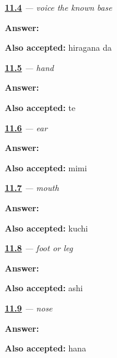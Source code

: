 \noindent\begin{minipage}[t]{\linewidth}
\raggedright
\hyperlink{review-JA-W11-da-write}{\textbf{11.4}} \emph{ — voice the known base}\par
\small \textbf{Answer:} \par
\footnotesize \textbf{Also accepted:} hiragana da
\end{minipage}\par\medskip

\noindent\begin{minipage}[t]{\linewidth}
\raggedright
\hyperlink{review-JA-C11-te-hand-meaning}{\textbf{11.5}} \emph{ — hand}\par
\small \textbf{Answer:} \par
\footnotesize \textbf{Also accepted:} te
\end{minipage}\par\medskip

\noindent\begin{minipage}[t]{\linewidth}
\raggedright
\hyperlink{review-JA-C11-mimi-meaning}{\textbf{11.6}} \emph{ — ear}\par
\small \textbf{Answer:} \par
\footnotesize \textbf{Also accepted:} mimi
\end{minipage}\par\medskip

\noindent\begin{minipage}[t]{\linewidth}
\raggedright
\hyperlink{review-JA-C11-kuchi-meaning}{\textbf{11.7}} \emph{ — mouth}\par
\small \textbf{Answer:} \par
\footnotesize \textbf{Also accepted:} kuchi
\end{minipage}\par\medskip

\noindent\begin{minipage}[t]{\linewidth}
\raggedright
\hyperlink{review-JA-C11-ashi-meaning}{\textbf{11.8}} \emph{ — foot or leg}\par
\small \textbf{Answer:} \par
\footnotesize \textbf{Also accepted:} ashi
\end{minipage}\par\medskip

\noindent\begin{minipage}[t]{\linewidth}
\raggedright
\hyperlink{review-JA-C11-hana-meaning}{\textbf{11.9}} \emph{ — nose}\par
\small \textbf{Answer:} \par
\footnotesize \textbf{Also accepted:} hana
\end{minipage}\par\medskip

